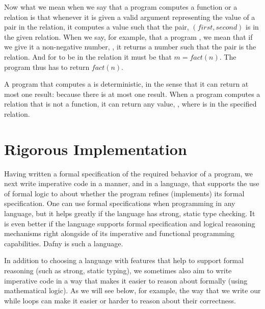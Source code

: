 \documentclass[letterpaper,10pt,english]{sphinxmanual}
\begin{document}
Now what we mean when we say that a program computes a function or a
relation is that whenever it is given a valid argument representing
the  value of a pair in the relation, it computes a 
value such that the pair, \((first, second)\) is in the given
relation. When we say, for example, that a program , we mean that if we give it a non-negative number,
, it returns a number  such that the pair  is  the
relation. And for  to be in the relation it must be that
\(m = fact(n)\). The program thus has to return \(fact(n)\).

A program that computes a  is deterministic, in the sense
that it can return at most one result: because there is at most one
result. When a program computes a relation that is not a function, it
can return any value, , where  is in the specified relation.


\section{Rigorous Implementation}
\label{\detokenize{05-putting-it-together:rigorous-implementation}}
Having written a formal specification of the required 
behavior of a program, we next write imperative code in a manner, and
in a language, that supports the use of formal logic to  about
whether the program refines (implements) its formal specification. One
can use formal specifications when programming in any language, but it
helps greatly if the language has strong, static type checking. It is
even better if the language supports formal specification and logical
reasoning mechanisms right alongside of its imperative and functional
programming capabilities. Dafny is such a language.

In addition to choosing a language with features that help to support
formal reasoning (such as strong, static typing), we sometimes also
aim to write imperative code in a way that makes it easier to reason
about formally (using mathematical logic). As we will see below, for
example, the way that we write our while loops can make it easier or
harder to reason about their correctness.
\end{document}

